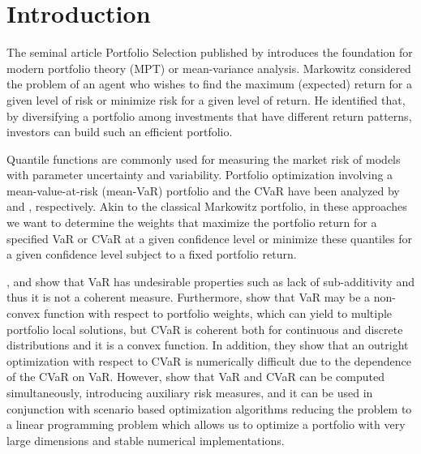 \documentclass[a4paper,10pt]{article}
\begin{document}
\makeatletter

\makeatother

 


\section{Introduction}

\label{introduction}

The seminal article Portfolio Selection published by  \citet*{markowitz1952} introduces the foundation for modern portfolio theory (MPT) or mean-variance analysis. Markowitz considered the problem of an agent who wishes to find the maximum (expected) return for a given level of risk or minimize risk for a given level of return. He identified that, by diversifying a portfolio among investments that have different return patterns, investors can build such an efficient portfolio.

Quantile functions are commonly used for measuring the market risk of models with parameter uncertainty and variability. Portfolio optimization involving a mean-value-at-risk (mean-VaR) portfolio and the CVaR have been analyzed by \citet*{alexander2002} and \citet*{rockafellar2000}, respectively. Akin to the classical Markowitz portfolio, in these approaches we want to determine the weights that maximize the portfolio return for a specified VaR or CVaR at a given confidence level or minimize these quantiles for a given confidence level subject to a fixed portfolio return.

\citet{artzner1999}, \citet*{szego2005} and \citet*{zhu2009worst} show that VaR has undesirable properties such as lack of sub-additivity and thus it is not a coherent measure. Furthermore, \citet*{uryasev2001} show that VaR may be a non-convex function with respect to portfolio weights, which can yield to multiple portfolio local solutions, but CVaR is coherent both for continuous and discrete distributions and it is a convex function. In addition, they show that an outright optimization with respect to CVaR is numerically difficult due to the dependence of the CVaR on VaR. However, \citet*{rockafellar2000} show that VaR and CVaR can be computed simultaneously, introducing auxiliary risk measures, and it can be used in conjunction with scenario based optimization algorithms reducing the problem to a linear programming problem which allows us to optimize a portfolio with very large dimensions and stable numerical implementations. 
\end{document}
